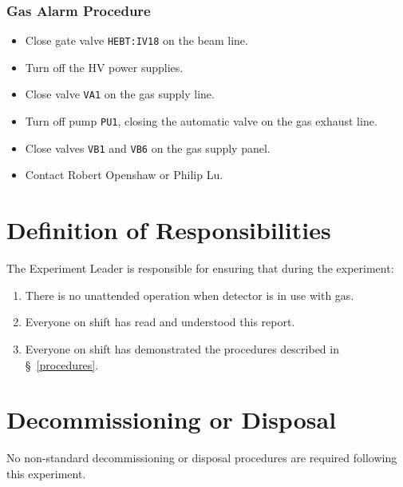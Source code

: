 \subsubsection{Gas Alarm Procedure}
\begin{itemize}
\setlength{\itemsep}{0pt}
\setlength{\parskip}{0pt}
\setlength{\parsep}{0pt}

\item Close gate valve \texttt{HEBT:IV18} on the beam line.
\item Turn off the HV power supplies.
\item Close valve \texttt{VA1} on the gas supply line.
\item Turn off pump \texttt{PU1}, closing the automatic valve on the gas exhaust line.
\item Close valves \texttt{VB1} and \texttt{VB6} on the gas supply panel.
\item Contact Robert Openshaw or Philip Lu.
\end{itemize}
\section{Definition of Responsibilities}
The Experiment Leader is responsible for ensuring that during the experiment:
\begin{enumerate}
\setlength{\itemsep}{0pt}
\setlength{\parskip}{0pt}
\setlength{\parsep}{0pt}

\item  There is no unattended operation when detector is in use with gas.
\item  Everyone on shift has read and understood this report.
\item  Everyone on shift has demonstrated the procedures described in \S~\ref{procedures}.
\end{enumerate}
\section{Decommissioning or Disposal}
No non-standard decommissioning or disposal procedures are required following this experiment.

 

